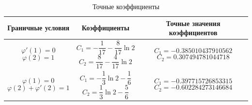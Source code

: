 \documentclass{article}
\begin{document}
\begin{table}[!h]
\centering
\begin{tabular}{|c|c|c|}
	\hline
	Граничные условия &
	Коэффициенты & 
	Точные значения коэффициентов \\
	\hline \hline

\parbox[c]{3cm}{
	\begin{displaymath}
		\varphi'(1) = 0
	\end{displaymath}
	\begin{displaymath}
		\varphi(2) = 1
	\end{displaymath}
} &

\parbox[c]{3cm}{
 	\begin{displaymath}
 		C_{1} = - \frac{1}{17} - \frac{8}{17} \ln{2}
 	\end{displaymath}
	\begin{displaymath} 	
 		C_{2} = \frac{8}{17} - \frac{4}{17} \ln{2}
 	\end{displaymath}
 	} & 
 	
\parbox[c]{4.07cm}{
 	\begin{displaymath}
 		C_{1} = -0.385010437910562 
 	\end{displaymath}
 	\begin{displaymath}
 		C_{2} = 0.307494781044718
 	\end{displaymath}
 	}\\	\hline
	
\parbox[c]{3cm}{
	\begin{displaymath}
		\varphi(1) = 0
	\end{displaymath}
	\begin{displaymath}
		\varphi(2) + \varphi'(2) = 1
	\end{displaymath}
	} &

\parbox[c]{3cm}{
 	\begin{displaymath}
 		C_{1} = - \frac{1}{3} \ln{2} - \frac{1}{6} 
 	\end{displaymath}
	\begin{displaymath} 	
 		C_{2} = \frac{1}{3} \ln{2} - \frac{5}{6}
 	\end{displaymath}
 	} & 
 	
\parbox[c]{4.07cm}{
 	\begin{displaymath}
 		C_{1} = -0.397715726853315
 	\end{displaymath}
 	\begin{displaymath}
 		C_{2} = -0.602284273146684
 	\end{displaymath}
 	}\\	\hline
\end{tabular}
\caption{Точные коэффициенты}
\label{table_exact_coefficients}
\end{table}
\end{document}
